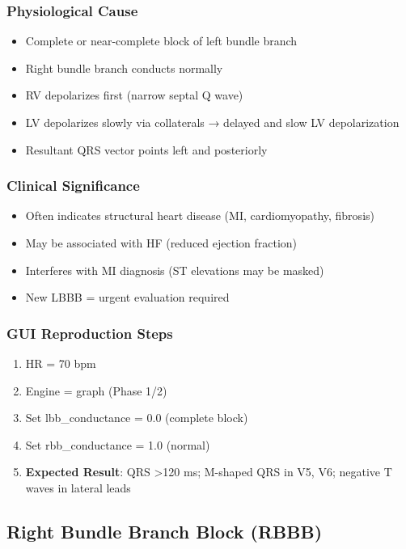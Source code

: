 \documentclass[11pt, a4paper]{article}
\begin{document}
\subsubsection{Physiological Cause}
\begin{itemize}
    \item Complete or near-complete block of left bundle branch
    \item Right bundle branch conducts normally
    \item RV depolarizes first (narrow septal Q wave)
    \item LV depolarizes slowly via collaterals → delayed and slow LV depolarization
    \item Resultant QRS vector points left and posteriorly
\end{itemize}

\subsubsection{Clinical Significance}
\begin{itemize}
    \item Often indicates structural heart disease (MI, cardiomyopathy, fibrosis)
    \item May be associated with HF (reduced ejection fraction)
    \item Interferes with MI diagnosis (ST elevations may be masked)
    \item New LBBB = urgent evaluation required
\end{itemize}

\subsubsection{GUI Reproduction Steps}
\begin{enumerate}
    \item HR = 70 bpm
    \item Engine = graph (Phase 1/2)
    \item Set lbb\_conductance = 0.0 (complete block)
    \item Set rbb\_conductance = 1.0 (normal)
    \item \textbf{Expected Result}: QRS >120 ms; M-shaped QRS in V5, V6; negative T waves in lateral leads
\end{enumerate}

\subsection{Right Bundle Branch Block (RBBB)}
\end{document}
